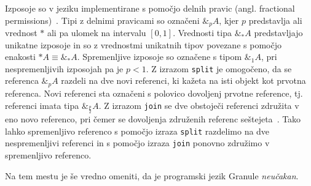Izposoje so v jeziku implementirane s pomočjo delnih pravic (angl. fractional permissions)~\cite{boyland2003checking}. Tipi z delnimi pravicami so označeni $\&_p A$, kjer $p$ predstavlja ali vrednost $*$ ali pa ulomek na intervalu $[0, 1]$. Vrednosti tipa $\&_{*} A$ predstavljajo unikatne izposoje in so z vrednostmi unikatnih tipov povezane s pomočjo enakosti $*A \equiv \&_{*} A$. Spremenljive izposoje so označene s tipom $\&_1 A$, pri nespremenljivih izposojah pa je $p < 1$. Z izrazom \texttt{split} je omogočeno, da se referenca $\&_p A$ razdeli na dve novi referenci, ki kažeta na isti objekt kot prvotna referenca. Novi referenci sta označeni s polovico dovoljenj prvotne reference, tj. referenci imata tipa $\&_{\frac{p}{2}} A$. Z izrazom \texttt{join} se dve obstoječi referenci združita v eno novo referenco, pri čemer se dovoljenja združenih referenc seštejeta~\cite{marshall2024functional}. Tako lahko spremenljivo referenco s pomočjo izraza \texttt{split} razdelimo na dve nespremenljivi referenci in s pomočjo izraza \texttt{join} ponovno združimo v spremenljivo referenco.

Na tem mestu je še vredno omeniti, da je programski jezik Granule \textit{neučakan}. 


